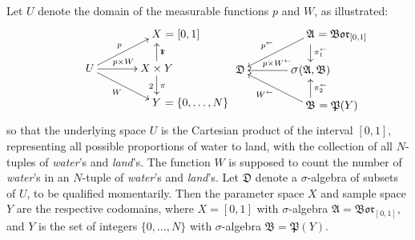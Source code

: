 \documentclass[
twoside=true,
paper=letter,
fontsize=9pt,
pagesize=auto,
leqno,
openany,
headsepline,
overfullrule,
]{scrbook}
\theoremstyle{plain}
\theoremstyle{plain}
\theoremstyle{definition}
\theoremstyle{bfnoteitalic}
\theoremstyle{bfnoteroman}
\newcommand{\sigalg}[1]{\mathfrak{#1}}
\newcommand{\borel}{\mathfrak{Bor}}
\newcommand{\sagb}{\mathop{\hbox{\large{$\sigma$}}}\nolimits}
\newcommand{\textsigma}{\hbox{\large{$\sigma$}}\kern-1pt}
\newcommand{\preimage}[1]{\mathop{#1^{\leftarrow}}}
\newcommand{\productsig}[2]{\sagb(#1,#2)}
\newcommand{\powerset}{\mathfrak{P}}
\newcommand{\measurespace}{X}
\newcommand{\measurespaceii}{Y}
\newcommand{\projectionone}{\pi_1}
\newcommand{\projectiontwo}{\pi_2}
\newcommand{\pspace}{\measurespace}%
\newcommand{\sspace}{\measurespaceii}%
\newcommand{\sspacesig}{\sigalg{B}}
\newcommand{\pspacesig}{\sigalg{A}}
\begin{document}
Let $U$ denote the domain of the measurable functions $p$ and $W$, as illustrated:
\[
\xymatrix@R=16pt@C=35pt{
 & \pspace \makebox[0pt][l]{$\ = [0,1]$}
 \\
 U
 \ar[ur]^{\makebox[0pt][r]{\scriptsize{$p$}}}
 \ar[dr]_{\makebox[0pt][r]{\scriptsize{$W$}}}
 \ar[r]^{p\times W} &
 \pspace\times\sspace \ar[u]_\projectionone \ar[d]^\projectiontwo
 \\
  & \sspace\rlap{ $=\{0,\ldots,N\}$} \\
}
%
\hspace{50pt}
%
\xymatrix@R=16pt@C=35pt{
 & \pspacesig \rlap{ $=\borel_{[0,1]}$}
 \ar[dl]_{\makebox[0pt][r]{\scriptsize{$\preimage{p}$}}}
 \ar[d]^{\preimage{\projectionone}}
 \\
 \sigalg{D}  & 
 \productsig{\pspacesig}{\sspacesig} 
 \ar[l]_{\ \preimage{p\times W}}
 \\
  & \sspacesig \rlap{ $=\powerset(\sspace)$}
  \ar[u]_{\preimage{\projectiontwo}}
  \ar[ul]^{\makebox[0pt][r]{\scriptsize{$\preimage{W}$}}}
  \\
}
\]
so that the underlying space  $U$ is the Cartesian product of the interval $[0,1]$, representing all possible proportions of water to land, with the collection of all $N$-tuples of \textit{water}'s and \textit{land}'s. The function $W$ is supposed to count the number of \textit{water}'s in an $N$-tuple of \textit{water}'s and \textit{land}'s.  Let 
$\sigalg{D}$ denote a \textsigma-algebra of subsets of $U$, to be qualified momentarily. Then 
the parameter space $\pspace$ and 
sample space $\sspace$ 
are the respective codomains, where $\pspace=[0,1]$ with \textsigma-algebra 
$\pspacesig = \borel_{[0,1]}$, and 
$\sspace$ is the set of integers $\{0,\ldots,N\}$ with \textsigma-algebra
$\sspacesig=\powerset(\sspace)$.
\end{document}
